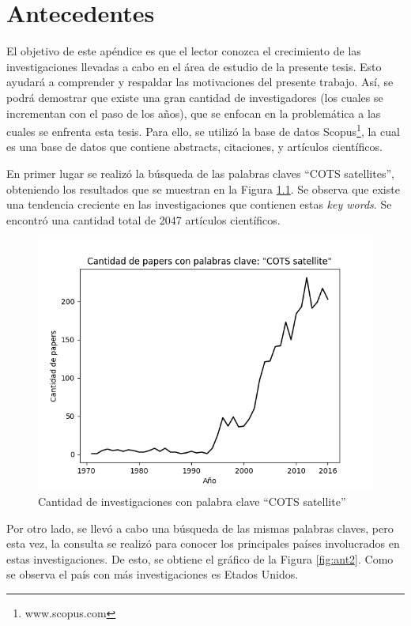 \chapter{Antecedentes}\label{Appendix:Antecedentes}

El objetivo de este apéndice es que el lector conozca el crecimiento de las investigaciones
llevadas a cabo en el área de estudio de la presente tesis. Esto ayudará a comprender
y respaldar las motivaciones del presente trabajo.
Así, se podrá demostrar que existe una gran cantidad de investigadores
(los cuales se incrementan con el paso de los años), que se enfocan en la problemática a las cuales
se enfrenta esta tesis. Para ello, se utilizó la base de datos Scopus\footnote{www.scopus.com}, la cual es una
base de datos que contiene abstracts, citaciones, y artículos científicos. 

En primer lugar se realizó la búsqueda de las palabras claves ``COTS satellites'', obteniendo los resultados
que se muestran en la Figura \ref{fig:ant1}. Se observa que existe una tendencia creciente en las investigaciones
que contienen estas \textit{key words}.
Se encontró una cantidad total de 2047 artículos científicos. 

\begin{figure}[h!]
 \centering
 \includegraphics[scale=0.8]{images/Secciones/antecedentes/Cantidad_paper-COTS-Satellite.png}
  \caption{Cantidad de investigaciones con palabra clave ``COTS satellite''}
\label{fig:ant1}
\end{figure}

Por otro lado, se llevó a cabo una búsqueda de las mismas palabras claves, pero esta vez,
la consulta se realizó para conocer los principales países involucrados en estas investigaciones.
De esto, se obtiene el gráfico de la Figura \ref{fig:ant2}. Como se observa el país con más
investigaciones es Etados Unidos.

